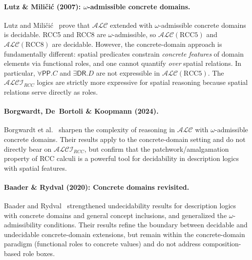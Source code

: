 \documentclass[a4paper,11pt]{article}
\theoremstyle{definition}
\newcommand{\ALC}{\ensuremath{\mathcal{ALC}}}
\newcommand{\ALCIRCC}[1]{\ensuremath{\mathcal{ALCI}_{\mathit{RCC#1}}}}
\newcommand{\DR}{\ensuremath{\mathsf{DR}}}
\newcommand{\PP}{\ensuremath{\mathsf{PP}}}
\begin{document}
\paragraph{Lutz \& Mili\v{c}i\'{c} (2007): $\omega$-admissible concrete domains.}
Lutz and Mili\v{c}i\'{c}~\cite{LutzMilicic2007} prove that $\ALC$
extended with $\omega$-admissible concrete domains is decidable.  RCC5
and RCC8 are $\omega$-admissible, so $\ALC(\mathrm{RCC5})$ and
$\ALC(\mathrm{RCC8})$ are decidable.  However, the concrete-domain
approach is fundamentally different: spatial predicates constrain
\emph{concrete features} of domain elements via functional roles, and
one cannot quantify \emph{over} spatial relations.  In particular,
$\forall \PP.C$ and $\exists \DR.D$ are not expressible in
$\ALC(\mathrm{RCC5})$.  The $\ALCIRCC{}$ logics are strictly more
expressive for spatial reasoning because spatial relations serve
directly as roles.

\paragraph{Borgwardt, De~Bortoli \& Koopmann (2024).}
Borgwardt et al.~\cite{BorgwardtEtAl2024} sharpen the complexity of
reasoning in $\ALC$ with $\omega$-admissible concrete domains.  Their
results apply to the concrete-domain setting and do not directly bear
on $\ALCIRCC{}$, but confirm that the patchwork/amalgamation property
of RCC calculi is a powerful tool for decidability in description
logics with spatial features.

\paragraph{Baader \& Rydval (2020): Concrete domains revisited.}
Baader and Rydval~\cite{BaaderRydval2020} strengthened undecidability
results for description logics with concrete domains and general
concept inclusions, and generalized the $\omega$-admissibility
conditions.  Their results refine the boundary between decidable and
undecidable concrete-domain extensions, but remain within the
concrete-domain paradigm (functional roles to concrete values) and do
not address composition-based role boxes.
\end{document}

